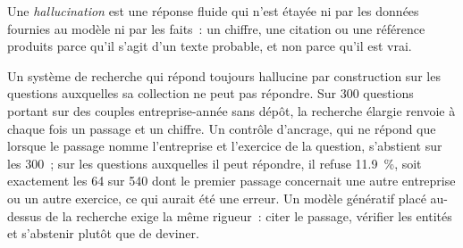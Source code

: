 \begin{omfigure}

\label{fig:ml:llm:retrieval}
\end{omfigure}

\begin{definition}[Hallucination]\label{def:ml:large-language-models-in-finance:hallucination}
Une \emph{hallucination} est une réponse fluide qui n'est étayée ni par les données fournies au modèle ni par les faits~: un
chiffre, une citation ou une référence produits parce qu'il s'agit d'un texte probable, et non parce qu'il est vrai.
\end{definition}

Un système de recherche qui répond toujours hallucine par construction sur les questions auxquelles sa collection ne peut pas répondre. Sur 300
questions portant sur des couples entreprise-année sans dépôt, la recherche élargie renvoie à chaque fois un passage et un chiffre. Un contrôle
d'ancrage, qui ne répond que lorsque le passage nomme l'entreprise et l'exercice de la question, s'abstient sur les 300~; sur les questions
auxquelles il peut répondre, il refuse 11.9~\%, soit exactement les 64 sur 540 dont le premier passage concernait une autre entreprise ou un autre exercice, ce qui aurait
été une erreur. Un modèle génératif placé au-dessus de la recherche exige la même rigueur~: citer le passage, vérifier les entités et
s'abstenir plutôt que de deviner.

